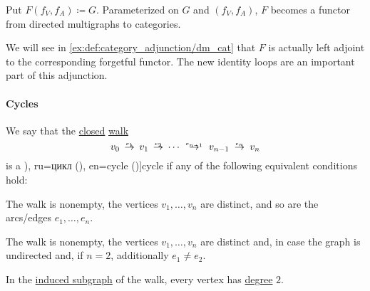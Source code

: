 \begin{definition}
  Put \( F(f_V, f_A) \coloneqq G \). Parameterized on \( G \) and \( (f_V, f_A) \), \( F \) becomes a functor from directed multigraphs to categories.
\end{definition}
\begin{comments}
  \item We will see in \cref{ex:def:category_adjunction/dm_cat} that \( F \) is actually left adjoint to the corresponding forgetful functor. The new identity loops are an important part of this adjunction.
\end{comments}

\paragraph{Cycles}

\begin{definition}\label{def:graph_cycle}
  We say that the \hyperref[def:graph_walk/closed]{closed} \hyperref[def:graph_walk]{walk}
  \begin{equation}\label{eq:def:graph_cycle}
    v_0 \reloset {e_1} \to v_1 \reloset {e_2} \to \cdots \reloset {e_{n-1}} \to v_{n-1} \reloset {e_n} \to v_n
  \end{equation}
  is a \term[bg=цикъл (\cite[11]{Мирчев2001Графи}), ru=цикл (\cite[279]{БелоусовТкачёв2004ДискретнаяМатематика}), en=cycle (\cite[13]{Harary1969GraphTheory})]{cycle} if any of the following equivalent conditions hold:
  \begin{thmenum}
     The walk is nonempty, the vertices \( v_1, \ldots, v_n \) are distinct, and so are the arcs/edges \( e_1, \ldots, e_n \).

    \mimprovised The walk is nonempty, the vertices \( v_1, \ldots, v_n \) are distinct and, in case the graph is undirected and, if \( n = 2 \), additionally \( e_1 \neq e_2 \).

     In the \hyperref[def:graph_walk/subgraph]{induced subgraph} of the walk, every vertex has \hyperref[def:graph_cardinality/directed_degree]{degree} \( 2 \).
  \end{thmenum}
\end{definition}
